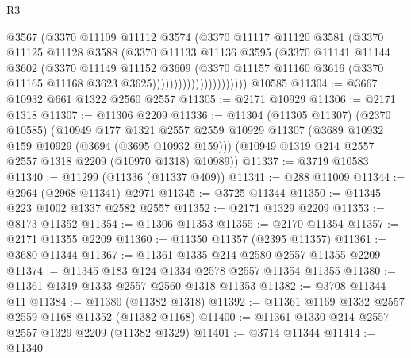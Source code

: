 \begin{lexlean}{R3}
\begin{coremodule}
                                @3567
                                (@3370
                                  @11109
                                  @11112
                                  @3574
                                  (@3370
                                    @11117
                                    @11120
                                    @3581
                                    (@3370
                                      @11125
                                      @11128
                                      @3588
                                      (@3370
                                        @11133
                                        @11136
                                        @3595
                                        (@3370
                                          @11141
                                          @11144
                                          @3602
                                          (@3370
                                            @11149
                                            @11152
                                            @3609
                                            (@3370
                                              @11157
                                              @11160
                                              @3616
                                              (@3370 @11165 @11168 @3623 @3625))))))))))))))))))))))
    @10585
@11304 := @3667 @10932 @661 @1322 @2560 @2557
@11305 := @2171 @10929
@11306 := @2171 @1318
@11307 := @11306 @2209
@11336 := @11304
    (@11305 @11307)
    (@2370 @10585)
    (@10949
      @177
      @1321
      @2557
      @2559
      @10929
      @11307
      (@3689 @10932 @159 @10929 (@3694 (@3695 @10932 @159)))
      (@10949 @1319 @214 @2557 @2557 @1318 @2209 (@10970 @1318) @10989))
@11337 := @3719 @10583
@11340 := @11299 (@11336 (@11337 @409))
@11341 := @288 @11009
@11344 := @2964 (@2968 @11341) @2971
@11345 := @3725 @11344
@11350 := @11345 @223 @1002 @1337 @2582 @2557
@11352 := @2171 @1329 @2209
@11353 := @8173 @11352
@11354 := @11306 @11353
@11355 := @2170 @11354
@11357 := @2171 @11355 @2209
@11360 := @11350 @11357 (@2395 @11357)
@11361 := @3680 @11344
@11367 := @11361 @1335 @214 @2580 @2557 @11355 @2209
@11374 := @11345 @183 @124 @1334 @2578 @2557 @11354 @11355
@11380 := @11361 @1319 @1333 @2557 @2560 @1318 @11353
@11382 := @3708 @11344 @11
@11384 := @11380 (@11382 @1318)
@11392 := @11361 @1169 @1332 @2557 @2559 @1168 @11352 (@11382 @1168)
@11400 := @11361 @1330 @214 @2557 @2557 @1329 @2209 (@11382 @1329)
@11401 := @3714 @11344
@11414 := @11340

\end{coremodule}
\end{lexlean}

